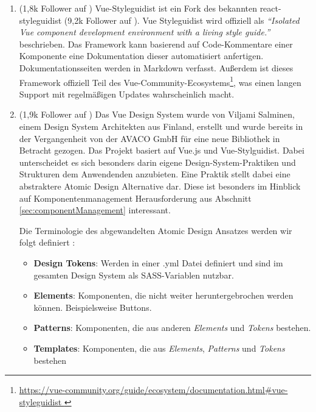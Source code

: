 \begin{enumerate}
    \item \textbf{} (1,8k Follower auf \cite{VueStyleguidistGithub})\newline
    Vue-Styleguidist ist ein Fork des bekannten react-styleguidist (9,2k Follower auf \cite{ReactStyleguidistGithub}). Vue Styleguidist wird offiziell als \emph{``Isolated Vue component development environment with a living style guide.''} \citep{VueStyleguidist} beschrieben. Das Framework kann basierend auf Code-Kommentare einer Komponente eine Dokumentation dieser automatisiert anfertigen. Dokumentationsseiten werden in Markdown verfasst. Außerdem ist dieses Framework offiziell Teil des Vue-Community-Ecosystems\footnote{ \url{https://vue-community.org/guide/ecosystem/documentation.html\#vue-styleguidist } }, was einen langen Support mit regelmäßigen Updates wahrscheinlich macht.
    \item \textbf{} (1,9k Follower auf \cite{VueDesignSystemGithub})\newline
    Das Vue Design System wurde von Viljami Salminen, einem Design System Architekten aus Finland, erstellt und wurde bereits in der Vergangenheit von der AVACO GmbH für eine neue Bibliothek in Betracht gezogen. Das Projekt basiert auf Vue.js und Vue-Stylguidist. Dabei unterscheidet es sich besonders darin eigene Design-System-Praktiken und Strukturen dem Anwendenden anzubieten. Eine Praktik stellt dabei eine abstraktere Atomic Design Alternative dar. Diese ist besonders im Hinblick auf Komponentenmanagement Herausforderung aus Abschnitt \ref{sec:componentManagement} interessant.

    Die Terminologie des abgewandelten Atomic Design Ansatzes werden wir folgt definiert \citep{VueDesignSystemTerminology}:
    \begin{itemize}
        \item \textbf{Design Tokens}: Werden in einer .yml Datei definiert und sind im gesamten Design System als SASS-Variablen nutzbar.
        \item \textbf{Elements}: Komponenten, die nicht weiter heruntergebrochen werden können. Beispielsweise Buttons.
        \item \textbf{Patterns}: Komponenten, die aus anderen \textit{Elements} und \textit{Tokens} bestehen.
        \item \textbf{Templates}: Komponenten, die aus \textit{Elements}, \textit{Patterns} und \textit{Tokens} bestehen
    \end{itemize}


\end{enumerate}
